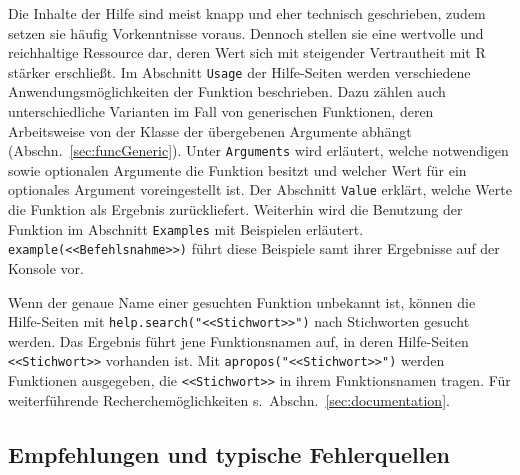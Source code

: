 Die Inhalte der Hilfe sind meist knapp und eher technisch geschrieben, zudem setzen sie häufig Vorkenntnisse voraus. Dennoch stellen sie eine wertvolle und reichhaltige Ressource dar, deren Wert sich mit steigender Vertrautheit mit R stärker erschließt. Im Abschnitt \lstinline!Usage! der Hilfe-Seiten werden verschiedene Anwendungsmöglichkeiten der Funktion beschrieben. Dazu zählen auch unterschiedliche Varianten im Fall von generischen Funktionen, deren Arbeitsweise von der Klasse der übergebenen Argumente abhängt (Abschn.\ \ref{sec:funcGeneric}). Unter \lstinline!Arguments! wird erläutert, welche notwendigen sowie optionalen Argumente die Funktion besitzt und welcher Wert für ein optionales Argument voreingestellt ist. Der Abschnitt \lstinline!Value! erklärt, welche Werte die Funktion als Ergebnis zurückliefert. Weiterhin wird die Benutzung der Funktion im Abschnitt \lstinline!Examples! mit Beispielen erläutert.  \lstinline!example(<<Befehlsnahme>>)! führt diese Beispiele samt ihrer Ergebnisse auf der Konsole vor.

Wenn der genaue Name einer gesuchten Funktion unbekannt ist, können die Hilfe-Seiten mit \lstinline!help.search("<<Stichwort>>")! nach Stichworten gesucht werden. Das Ergebnis führt jene Funktionsnamen auf, in deren Hilfe-Seiten \lstinline!<<Stichwort>>! vorhanden ist. Mit \lstinline!apropos("<<Stichwort>>")! werden Funktionen ausgegeben, die \lstinline!<<Stichwort>>! in ihrem Funktionsnamen tragen. Für weiterführende Recherchemöglichkeiten s.\ Abschn.\ \ref{sec:documentation}.


\subsection{Empfehlungen und typische Fehlerquellen}
\label{sec:mistakes}

